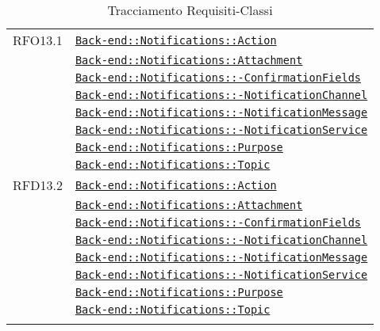 \begin{longtable}{|>{\centering}m{3cm}|m{10cm}<{\centering}|}
RFO13.1 & \hyperref[Back-end::Notifications::Action]{\texttt{Back-end::Notifications::Action}}\\
& \hyperref[Back-end::Notifications::Attachment]{\texttt{Back-end::Notifications::Attachment}}\\
& \hyperref[Back-end::Notifications::ConfirmationFields]{\texttt{Back-end::Notifications::-\linebreak ConfirmationFields}}\\
& \hyperref[Back-end::Notifications::NotificationChannel]{\texttt{Back-end::Notifications::-\linebreak NotificationChannel}}\\
& \hyperref[Back-end::Notifications::NotificationMessage]{\texttt{Back-end::Notifications::-\linebreak NotificationMessage}}\\
& \hyperref[Back-end::Notifications::NotificationService]{\texttt{Back-end::Notifications::-\linebreak NotificationService}}\\
& \hyperref[Back-end::Notifications::Purpose]{\texttt{Back-end::Notifications::Purpose}}\\
& \hyperref[Back-end::Notifications::Topic]{\texttt{Back-end::Notifications::Topic}}\\ \hline

RFD13.2 & \hyperref[Back-end::Notifications::Action]{\texttt{Back-end::Notifications::Action}}\\
& \hyperref[Back-end::Notifications::Attachment]{\texttt{Back-end::Notifications::Attachment}}\\
& \hyperref[Back-end::Notifications::ConfirmationFields]{\texttt{Back-end::Notifications::-\linebreak ConfirmationFields}}\\
& \hyperref[Back-end::Notifications::NotificationChannel]{\texttt{Back-end::Notifications::-\linebreak NotificationChannel}}\\
& \hyperref[Back-end::Notifications::NotificationMessage]{\texttt{Back-end::Notifications::-\linebreak NotificationMessage}}\\
& \hyperref[Back-end::Notifications::NotificationService]{\texttt{Back-end::Notifications::-\linebreak NotificationService}}\\
& \hyperref[Back-end::Notifications::Purpose]{\texttt{Back-end::Notifications::Purpose}}\\
& \hyperref[Back-end::Notifications::Topic]{\texttt{Back-end::Notifications::Topic}}\\ \hline

\caption[Tracciamento Requisiti-Classi]{Tracciamento Requisiti-Classi}
\label{tabella:requi-class}
\end{longtable}
\clearpage

